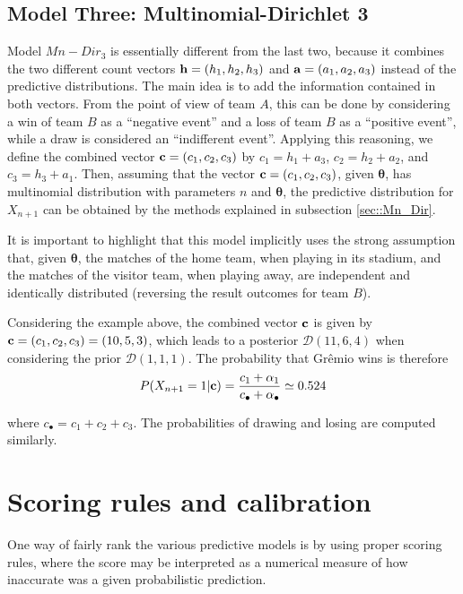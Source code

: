 \documentclass[journal,article,accept,moreauthors,pdftex,12pt,a4paper]{mdpi}
\begin{document}
	\subsection{Model Three: Multinomial-Dirichlet 3}
	\label{sec::Mn_Dir3}
	
	Model $Mn-Dir_3$ is essentially different from the
	last two, because it combines the two different count vectors ${\bf
		h} = (h_1, h_2, h_3)$ and ${\bf a} = (a_1, a_2, a_3)$ instead of the
	predictive distributions. The main idea is to add the information
	contained in both vectors. From the point of view of team $A$, this can
	be done by considering a win of team $B$ as a ``negative event'' and a
	loss of team $B$ as a ``positive event'', while a draw is
	considered an ``indifferent event''. Applying this reasoning,
	we define the combined vector ${\bf c} = (c_1, c_2, c_3)$ by $c_1 =
	h_1 + a_3$, $c_2 = h_2 + a_2$, and $c_3 = h_3 + a_1$. Then, assuming that the vector ${\bf c} = (c_1, c_2, c_3)$, given $\boldsymbol{\theta}$, has multinomial distribution with parameters $n$ and
	$\boldsymbol{\theta}$, the predictive distribution for $X_{n + 1}$ can
	be obtained by the methods explained in subsection
	\ref{sec::Mn_Dir}.
	
	It is important to highlight that this model implicitly uses the strong assumption that, given $\boldsymbol{\theta}$, the matches of the home team, when playing in its stadium, and the matches of the visitor team, when playing away, are independent and identically distributed (reversing the result outcomes for team $B$).
	
	Considering the example above, the combined vector ${\bf c}$ is given by ${\bf c}=(c_1,c_2,c_3)=(10,5,3)$, which leads to a posterior $\mathcal{D}(11,6,4)$ when considering the prior $\mathcal{D}(1,1,1)$.
	The probability that Gr\^emio wins is therefore
	\[P(X_{n+1}=1|{\bf c})=\frac{c_1+\alpha_1}{c_{\bullet}+\alpha_{\bullet}}\simeq0.524
	\]
	
	\noindent
	where $c_{\bullet}=c_1+c_2+c_3$. The probabilities of drawing and losing are computed similarly.
	
	\section{Scoring rules and calibration}
	\label{sec::scoring}
	
	One way of fairly rank the various predictive models is by using proper scoring rules, where
	the score may be interpreted as a numerical measure of how inaccurate was a given probabilistic prediction.
	
\end{document}
